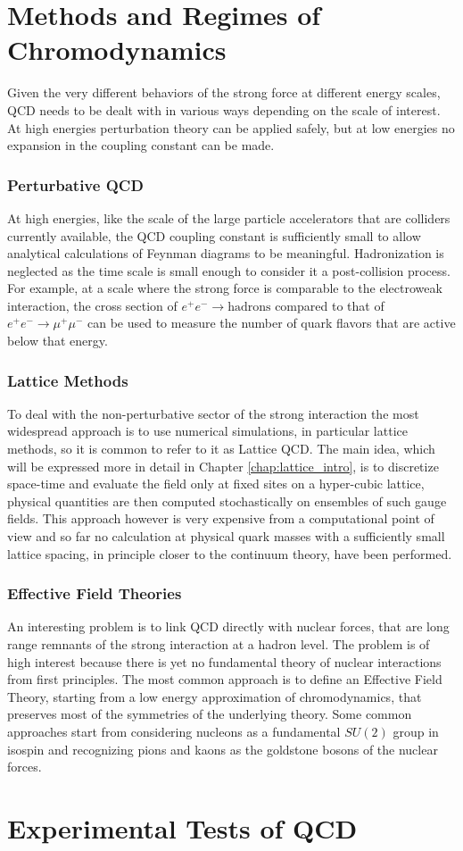\section{Methods and Regimes of Chromodynamics}
Given the very different behaviors of the strong force at different energy scales, QCD needs to be dealt with in various ways depending on the scale of interest. At high energies perturbation theory can be applied safely, but at low energies no expansion in the coupling constant can be made. 

\subsubsection{Perturbative QCD}
At high energies, like the scale of the large particle accelerators that are colliders currently available, the QCD coupling constant is sufficiently small to allow analytical calculations of Feynman diagrams to be meaningful. Hadronization is neglected as the time scale is small enough to consider it a post-collision process. For example, at a scale where the strong force is comparable to the electroweak interaction, the cross section of $e^+e^-\rightarrow \text{hadrons}$ compared to that of $e^+e^-\rightarrow \mu^+\mu^-$ can be used to measure the number of quark flavors that are active below that energy. 

\subsubsection{Lattice Methods}
To deal with the non-perturbative sector of the strong interaction the most widespread approach is to use numerical simulations, in particular lattice methods, so it is common to refer to it as Lattice QCD. The main idea, which will be expressed more in detail in Chapter \ref{chap:lattice_intro}, is to discretize space-time and evaluate the field only at fixed sites on a hyper-cubic lattice, physical quantities are then computed stochastically on ensembles of such gauge fields. This approach however is very expensive from a computational point of view and so far no calculation at physical quark masses with a sufficiently small lattice spacing, in principle closer to the continuum theory, have been performed.

\subsubsection{Effective Field Theories}
An interesting problem is to link QCD directly with nuclear forces, that are long range remnants of the strong interaction at a hadron level. The problem is of high interest because there is yet no fundamental theory of nuclear interactions from first principles. The most common approach is to define an Effective Field Theory, starting from a low energy approximation of chromodynamics, that preserves most of the symmetries of the underlying theory. Some common approaches start from considering nucleons as a fundamental $SU(2)$ group in isospin and recognizing pions and kaons as the goldstone bosons of the nuclear forces. 

\section{Experimental Tests of QCD} 
